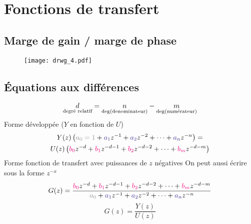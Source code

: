 \documentclass[resume]{subfiles}
\begin{document}
\section{Fonctions de transfert}
\subsection{Marge de gain / marge de phase}
\begin{figure}[H]
\centering
\texttt{[image: drwg\_4.pdf]}
\end{figure}
\subsection{Équations aux différences}
\label{sec_eq_diff}
$$\LARGE \underset{\text{degré relatif}}{d}=\underset{\deg(\text{denominateur})}{n}-\underset{\deg(\text{numérateur})}{m}$$
Forme développée ($Y$ en fonction de $U$)
\begin{multline*}
Y(z)\left(\textcolor{Gray}{a_0=1}+\acolor{a_1}z^{-1}+\acolor{a_2}z^{-2}+\cdots+\acolor{a_n}z^{-n}\right)=\\U(z)\left(\bcolor{b_0}z^{-d}+\bcolor{b_1}z^{-d-1}+\bcolor{b_2}z^{-d-2}+\cdots+\bcolor{b_m}z^{-d-m}\right)
\end{multline*}
Forme fonction de transfert avec puissances de $z$ négatives
On peut aussi écrire sous la forme $z^{-x}$
$$G(z)=\frac{\bcolor{b_0}z^{-d}+\bcolor{b_1}z^{-d-1}+\bcolor{b_2}z^{-d-2}+\cdots+\bcolor{b_m}z^{-d-m}}{\textcolor{Gray}{a_0}+\acolor{a_1}z^{-1}+\acolor{a_2}z^{-2}+\cdots+\acolor{a_n}z^{-n}}$$
$$G(z)=\frac{Y(z)}{U(z)}$$
\end{document}

